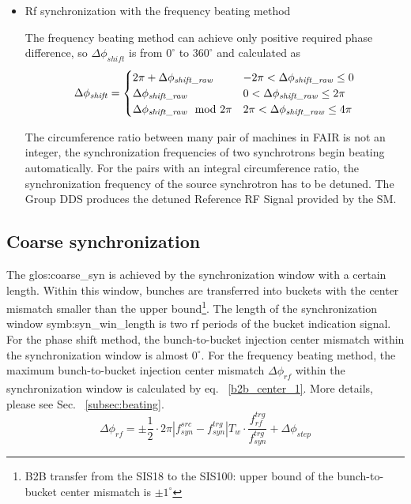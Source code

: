\begin{itemize}
\item Rf synchronization with the frequency beating method

The frequency beating method can achieve only positive required phase difference, so $\Delta \phi_\mathit{shift}$ is from $0^\circ$ to $360^\circ$ and calculated as
\begin{eqnarray}\Delta \phi_\mathit{shift}=
\begin{cases} 
2\pi+ \Delta \phi_\mathit{shift\_raw} & -2\pi<\Delta \phi_\mathit{shift\_raw}\le0 \cr

\Delta \phi_\mathit{shift\_raw} & 0<\Delta \phi_\mathit{shift\_raw}\le 2\pi \cr

\Delta \phi_\mathit{shift\_raw} \mod 2\pi &  2\pi<\Delta \phi_\mathit{shift\_raw}\le4\pi \cr

\end{cases}
\end{eqnarray}


The circumference ratio between many pair of machines in FAIR is not an integer, the synchronization frequencies of two synchrotrons begin beating automatically. For the pairs with an integral circumference ratio, the synchronization frequency of the source synchrotron has to be detuned. The Group DDS produces the detuned Reference RF Signal provided by the SM. 
\end{itemize}


\subsection{Coarse synchronization}

The \gls{glos:coarse_syn} is achieved by the synchronization window with a certain length. Within this window, bunches are transferred into buckets with the center mismatch smaller than the upper bound\footnote{B2B transfer from the SIS18 to the SIS100: upper bound of the bunch-to-bucket center mismatch is $\pm1^\circ$}. The length of the synchronization window \gls{symb:syn_win_length} is two rf periods of the bucket indication signal. For the phase shift method, the bunch-to-bucket injection center mismatch within the synchronization window is almost $0^\circ$. For the frequency beating method, the maximum bunch-to-bucket injection center mismatch $\Delta \phi_\mathit{rf}$ within the synchronization window is calculated by eq. ~\ref{b2b_center_1}. More details, please see Sec. ~\ref{subsec:beating}.
\begin{equation}
\Delta \phi_\mathit{rf}=\pm \frac{1}{2}\cdot 2\pi|f_{\mathit{syn}}^\mathit{src}-f_{\mathit{syn}}^\mathit{trg}|T_\mathit{w}\cdot \frac{f_{\mathit{rf}}^\mathit{trg}}{f_{\mathit{syn}}^\mathit{trg}}+\Delta \phi_\mathit{step}\label{b2b_center_1}
\end{equation}

